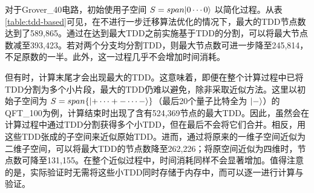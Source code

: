 对于Grover\_40电路，初始使用子空间 $S=span{\ket{0\cdots0}}$ 以简化过程。从表\ref{table:tdd-based}可见，在不进行一步迁移算法优化的情况下，最大的TDD节点数达到了589,865。通过在达到最大TDD之前实施基于TDD的分割，可以将最大节点数减至393,423。若对两个分支均分割TDD，则最大节点数可进一步降至245,814，不足原数的一半。此外，这一过程几乎不会增加时间消耗。
    
但有时，计算末尾才会出现最大的TDD。这意味着，即便在整个计算过程中已将TDD分割为多个小片段，最大的TDD仍难以避免，除非采取近似方法。这里以初始子空间为 $S=span\{\ket{+\cdots+ -\cdots -}\}$（最后20个量子比特全为 $\ket{-}$）的QFT\_100为例，计算结束时出现了含有524,369节点的最大TDD。因此，虽然会在计算过程中通过TDD分割获得多个小TDD，但在最后不会将它们合并。相反，用这些TDD张成的子空间来近似原始TDD。进而，通过将原来的一维子空间近似为二维子空间，可以将最大TDD的节点数降至262,226；将原空间近似为四维时，节点数可降至131,155。在整个近似过程中，时间消耗同样不会显著增加。值得注意的是，实际验证时无需将这些小TDD同时存储于内存中，而可以逐一进行计算与验证。

\begin{table}[]
    \centering
    \caption{TDD拆分与近似的优化方案}

    \label{table:tdd-based}
\end{table}

